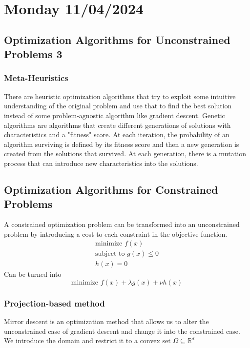\section{Monday 11/04/2024}
\subsection{Optimization Algorithms for Unconstrained Problems 3}
\subsubsection{Meta-Heuristics}
There are heuristic optimization algorithms that try to exploit some intuitive understanding of the original problem and use that to find the best solution instead of some problem-agnostic algorithm like gradient descent. Genetic algorithms are algorithms that create different generations of solutions with characteristics and a "fitness" score. At each iteration, the probability of an algorithm surviving is defined by its fitness score and then a new generation is created from the solutions that survived. At each generation, there is a mutation process that can introduce new characteristics into the solutions.
\subsection{Optimization Algorithms for Constrained Problems}
A constrained optimization problem can be transformed into an unconstrained problem by introducing a cost to each constraint in the objective function.
\begin{equation}
  \begin{aligned}
    \text{minimize } f(x) \\
    \text{subject to } g(x) \leq 0 \\
    h(x) = 0
  \end{aligned}
\end{equation}
Can be turned into
\begin{equation}
  \text{minimize } f(x) + \lambda g(x) + \nu h(x)
\end{equation}

\subsubsection{Projection-based method}
Mirror descent is an optimization method that allows us to alter the unconstrained case of gradient descent and change it into the constrained case. We introduce the domain and restrict it to a convex set $\Omega \subseteq \mathbb{R}^d$